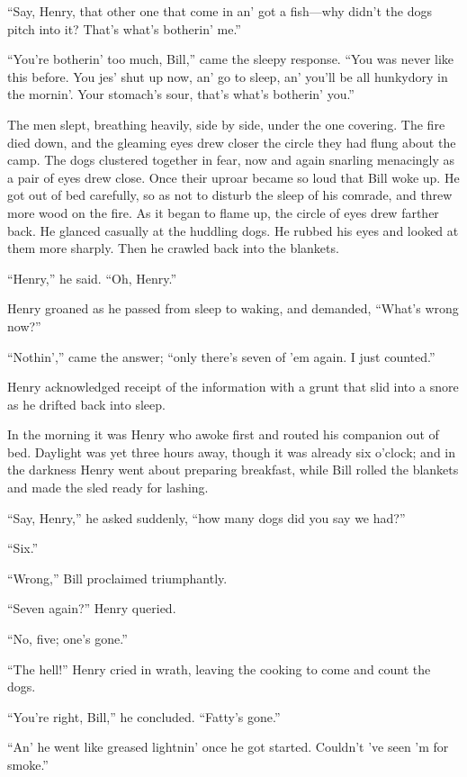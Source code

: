 “Say, Henry, that other one that come in an’ got a fish—why didn’t the
dogs pitch into it? That’s what’s botherin’ me.”

“You’re botherin’ too much, Bill,” came the sleepy response. “You was
never like this before. You jes’ shut up now, an’ go to sleep, an’
you’ll be all hunkydory in the mornin’. Your stomach’s sour, that’s
what’s botherin’ you.”

The men slept, breathing heavily, side by side, under the one covering.
The fire died down, and the gleaming eyes drew closer the circle they
had flung about the camp. The dogs clustered together in fear, now and
again snarling menacingly as a pair of eyes drew close. Once their
uproar became so loud that Bill woke up. He got out of bed carefully,
so as not to disturb the sleep of his comrade, and threw more wood on
the fire. As it began to flame up, the circle of eyes drew farther
back. He glanced casually at the huddling dogs. He rubbed his eyes and
looked at them more sharply. Then he crawled back into the blankets.

“Henry,” he said. “Oh, Henry.”

Henry groaned as he passed from sleep to waking, and demanded, “What’s
wrong now?”

“Nothin’,” came the answer; “only there’s seven of ’em again. I just
counted.”

Henry acknowledged receipt of the information with a grunt that slid
into a snore as he drifted back into sleep.

In the morning it was Henry who awoke first and routed his companion
out of bed. Daylight was yet three hours away, though it was already
six o’clock; and in the darkness Henry went about preparing breakfast,
while Bill rolled the blankets and made the sled ready for lashing.

“Say, Henry,” he asked suddenly, “how many dogs did you say we had?”

“Six.”

“Wrong,” Bill proclaimed triumphantly.

“Seven again?” Henry queried.

“No, five; one’s gone.”

“The hell!” Henry cried in wrath, leaving the cooking to come and count
the dogs.

“You’re right, Bill,” he concluded. “Fatty’s gone.”

“An’ he went like greased lightnin’ once he got started. Couldn’t ’ve
seen ’m for smoke.”

